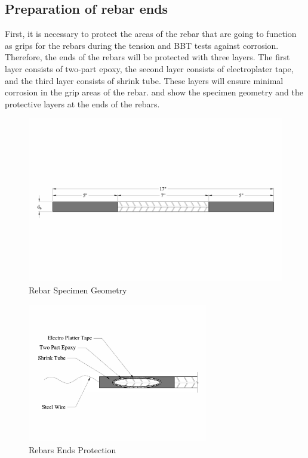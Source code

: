 \subsection{Preparation of rebar ends}

First, it is necessary to protect the areas of the rebar that are going to function as grips for the rebars during the tension and BBT tests against corrosion. Therefore, the ends of the rebars will be protected with three layers. The first layer consists of two-part epoxy, the second layer consists of electroplater tape, and the third layer consists of shrink tube. These layers will ensure minimal corrosion in the grip areas of the rebar.  and  show the specimen geometry and the protective layers at the ends of the rebars.
\begin{figure}[htbp]
	\centering
	\includegraphics[width=1.0\textwidth]{Chapter-3/figs/RebarSamples}
	\caption{Rebar Specimen Geometry}
	\label{fig:RebarSpecimenGeomtry}
\end{figure}

\begin{figure}[htbp]
	\centering
	\includegraphics[width=0.7\textwidth]{Chapter-3/figs/Rebar_Ends}
	\caption{Rebars Ends Protection}
	\label{fig:RebarEndsProtection}
\end{figure}
\newpage 

